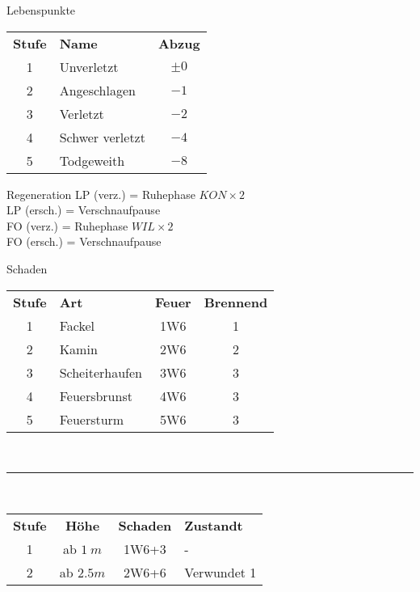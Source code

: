 \documentclass[a4paper, 11pt]{article}
\begin{document}
\sffamily
{}
\begin{multicols}{3}
\begin{spmbox}{Lebenspunkte}
        \begin{tabularx}{\linewidth}{c X c}
                \rowcolor{spmtabelle2}
        \textbf{Stufe} & \textbf{Name} & \textbf{Abzug} \\
                1   &   Unverletzt  & $\pm 0$ \\
                2   &   Angeschlagen & $-1$ \\
                3   & Verletzt & $-2$ \\
                4   & Schwer verletzt & $-4$ \\
                5   & Todgeweith & $-8$ 
        \end{tabularx}
\end{spmbox}
\begin{spmbox}{Regeneration}
                LP (verz.) = Ruhephase $KON\times 2$\\
                LP (ersch.) = Verschnaufpause\\
                FO (verz.) = Ruhephase $WIL\times 2$ \\
                FO (ersch.) = Verschnaufpause 
\end{spmbox}
\begin{spmbox}{Schaden}
        \begin{tabularx}{\linewidth}{c X c c}
            \rowcolor{spmtabelle2}
            \textbf{Stufe} & \textbf{Art} & \textbf{Feuer} & \textbf{Brennend} \\
            1 & Fackel & 1W6 & 1\\
            2 & Kamin & 2W6 & 2\\
            3 & Scheiterhaufen & 3W6 & 3 \\
            4 & Feuersbrunst & 4W6 & 3 \\
            5 & Feuersturm & 5W6 & 3 \\
        \end{tabularx}\\
        \rule{\linewidth}{.2em}\\
        \begin{tabularx}{\linewidth}{c c c X}
            \rowcolor{spmtabelle2}
            \textbf{Stufe} & \textbf{Höhe} & \textbf{Schaden} & \textbf{Zustandt} \\
            1 & ab $1~m$ & 1W6+3 & - \\
            2 & ab $2.5m$  & 2W6+6   & Verwundet 1\\

\end{tabularx}
\end{spmbox}
\end{multicols}
\end{document}
